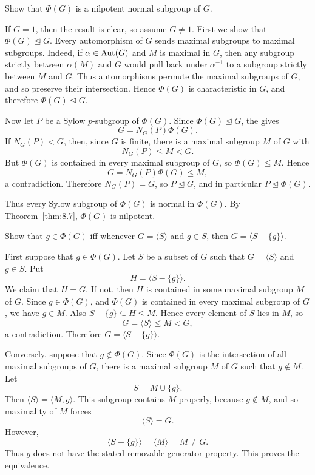 \documentclass[../Odyssey_Project.tex]{subfiles}
\begin{document}
\begin{exercise}
\label{ex:8.8}
Show that $\Phi(G)$ is a nilpotent normal subgroup of $G$.
\end{exercise}
\begin{solution}
If $G=1$, then the result is clear, so assume $G\neq 1$. First we show that $\Phi(G)\trianglelefteq G$. Every automorphism of $G$ sends maximal subgroups to maximal subgroups. Indeed, if $\alpha\in\operatorname{Aut}(G)$ and $M$ is maximal in $G$, then any subgroup strictly between $\alpha(M)$ and $G$ would pull back under $\alpha^{-1}$ to a subgroup strictly between $M$ and $G$. Thus automorphisms permute the maximal subgroups of $G$, and so preserve their intersection. Hence $\Phi(G)$ is characteristic in $G$, and therefore $\Phi(G)\trianglelefteq G$.

Now let $P$ be a Sylow $p$-subgroup of $\Phi(G)$. Since $\Phi(G)\trianglelefteq G$, the  gives
\[
    G=N_G(P)\Phi(G).
\]
If $N_G(P)<G$, then, since $G$ is finite, there is a maximal subgroup $M$ of $G$ with
\[
    N_G(P)\leq M<G.
\]
But $\Phi(G)$ is contained in every maximal subgroup of $G$, so $\Phi(G)\leq M$. Hence
\[
    G=N_G(P)\Phi(G)\leq M,
\]
a contradiction. Therefore $N_G(P)=G$, so $P\trianglelefteq G$, and in particular $P\trianglelefteq \Phi(G)$.

Thus every Sylow subgroup of $\Phi(G)$ is normal in $\Phi(G)$. By Theorem~\ref{thm:8.7}, $\Phi(G)$ is nilpotent.
\end{solution}

\begin{exercise}
\label{ex:8.9}
Show that $g \in \Phi(G)$ iff whenever $G = \langle S \rangle$ and $g \in S$, then $G = \langle S - \{g\} \rangle$.
\end{exercise}
\begin{solution}
First suppose that $g\in\Phi(G)$. Let $S$ be a subset of $G$ such that $G=\langle S\rangle$ and $g\in S$. Put
\[
    H=\langle S-\{g\}\rangle.
\]
We claim that $H=G$. If not, then $H$ is contained in some maximal subgroup $M$ of $G$. Since $g\in\Phi(G)$, and $\Phi(G)$ is contained in every maximal subgroup of $G$, we have $g\in M$. Also $S-\{g\}\subseteq H\leq M$. Hence every element of $S$ lies in $M$, so
\[
    G=\langle S\rangle\leq M<G,
\]
a contradiction. Therefore $G=\langle S-\{g\}\rangle$.

Conversely, suppose that $g\notin\Phi(G)$. Since $\Phi(G)$ is the intersection of all maximal subgroups of $G$, there is a maximal subgroup $M$ of $G$ such that $g\notin M$. Let
\[
    S=M\cup\{g\}.
\]
Then $\langle S\rangle=\langle M,g\rangle$. This subgroup contains $M$ properly, because $g\notin M$, and so maximality of $M$ forces
\[
    \langle S\rangle=G.
\]
However,
\[
    \langle S-\{g\}\rangle=\langle M\rangle=M\neq G.
\]
Thus $g$ does not have the stated removable-generator property. This proves the equivalence.
\end{solution}
\end{document}
